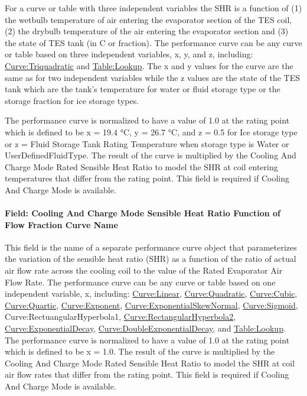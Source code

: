 For a curve or table with three independent variables the SHR is a function of (1) the wetbulb temperature of air entering the evaporator section of the TES coil, (2) the drybulb temperature of the air entering the evaporator section and (3) the state of TES tank (in C or fraction). The performance curve can be any curve or table based on three independent variables, x, y, and z, including: \hyperref[curvetriquadratic]{Curve:Triquadratic} and \hyperref[tablelookup]{Table:Lookup}. The x and y values for the curve are the same as for two independent variables while the z values are the state of the TES tank which are the tank's temperature for water or fluid storage type or the storage fraction for ice storage types.

The performance curve is normalized to have a value of 1.0 at the rating point which is defined to be x = 19.4 °C, y = 26.7 °C, and z = 0.5 for Ice storage type or z = Fluid Storage Tank Rating Temperature when storage type is Water or UserDefinedFluidType. The result of the curve is multiplied by the Cooling And Charge Mode Rated Sensible Heat Ratio to model the SHR at coil entering temperatures that differ from the rating point. This field is required if Cooling And Charge Mode is available.

\paragraph{Field: Cooling And Charge Mode Sensible Heat Ratio Function of Flow Fraction Curve Name}\label{field-cooling-and-charge-mode-sensible-heat-ratio-function-of-flow-fraction-curve-name}

This field is the name of a separate performance curve object that parameterizes the variation of the sensible heat ratio (SHR) as a function of the ratio of actual air flow rate across the cooling coil to the value of the Rated Evaporator Air Flow Rate. The performance curve can be any curve or table based on one independent variable, x, including: \hyperref[curvelinear]{Curve:Linear}, \hyperref[curvequadratic]{Curve:Quadratic}, \hyperref[curvecubic]{Curve:Cubic}, \hyperref[curvequartic]{Curve:Quartic}, \hyperref[curveexponent]{Curve:Exponent}, \hyperref[curveexponentialskewnormal]{Curve:ExponentialSkewNormal}, \hyperref[curvesigmoid]{Curve:Sigmoid}, Curve:RectuangularHyperbola1, \hyperref[curverectangularhyperbola2]{Curve:RectangularHyperbola2}, \hyperref[curveexponentialdecay]{Curve:ExponentialDecay}, \hyperref[curvedoubleexponentialdecay]{Curve:DoubleExponentialDecay}, and \hyperref[tablelookup]{Table:Lookup}. The performance curve is normalized to have a value of 1.0 at the rating point which is defined to be x = 1.0. The result of the curve is multiplied by the Cooling And Charge Mode Rated Sensible Heat Ratio to model the SHR at coil air flow rates that differ from the rating point. This field is required if Cooling And Charge Mode is available.

